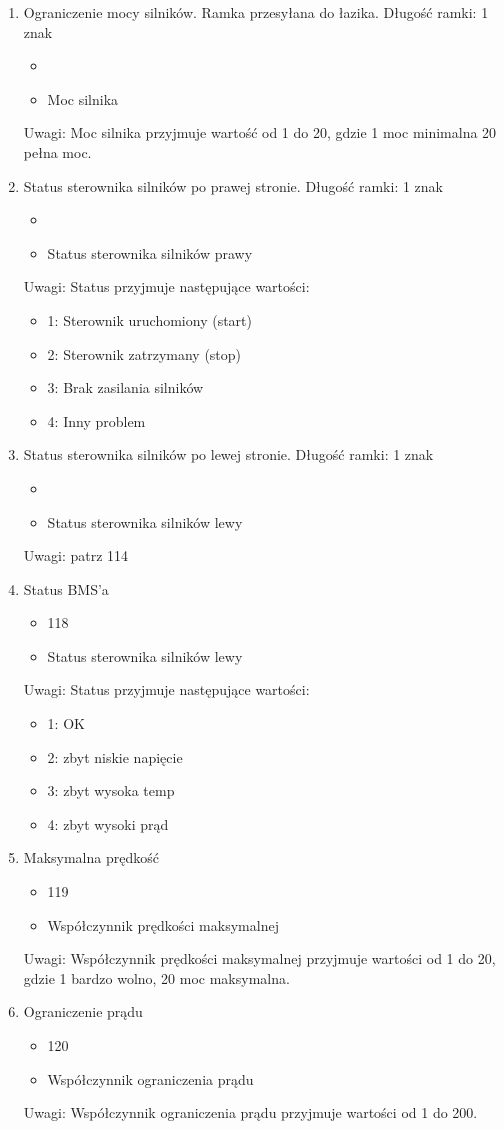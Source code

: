 \documentclass{article}
\begin{document}
\begin{enumerate}
	\item Ograniczenie mocy silników. Ramka przesyłana do łazika. Długość ramki: 1 znak
		\begin{itemize}
		\item {}
		\item Moc silnika
		\end{itemize}
	Uwagi: Moc silnika przyjmuje wartość od 1 do 20, gdzie 1 moc minimalna 20 pełna moc. 
	\item Status sterownika silników po prawej stronie. Długość ramki: 1 znak
		\begin{itemize}
		\item {}
		\item Status sterownika silników prawy
		\end{itemize}
		Uwagi: Status przyjmuje następujące wartości:
		\begin{itemize}
		\item 1: Sterownik uruchomiony (start)
		\item 2: Sterownik zatrzymany (stop)
		\item 3: Brak zasilania silników 
		\item 4: Inny problem 
		\end{itemize}
	\item Status sterownika silników po lewej stronie. Długość ramki: 1 znak
		\begin{itemize}
		\item {}
		\item Status sterownika silników lewy
		\end{itemize}
		Uwagi: patrz 114
	\item Status BMS'a
		\begin{itemize}
		\item 118
		\item Status sterownika silników lewy
		\end{itemize}
		Uwagi: Status przyjmuje następujące wartości:
		\begin{itemize}
		\item 1: OK
		\item 2: zbyt niskie napięcie
		\item 3: zbyt wysoka temp
		\item 4: zbyt wysoki prąd
		\end{itemize}
	\item Maksymalna prędkość
		\begin{itemize}
		\item 119
		\item Współczynnik prędkości maksymalnej 
		\end{itemize}
		Uwagi: Współczynnik prędkości maksymalnej przyjmuje wartości od 1 do 20, gdzie 1 bardzo wolno, 20 moc maksymalna.
	\item Ograniczenie prądu
		\begin{itemize}
		\item 120
		\item Współczynnik ograniczenia prądu
		\end{itemize}
		Uwagi: Współczynnik ograniczenia prądu przyjmuje wartości od 1 do 200. 
	\end{enumerate}
\end{document}
